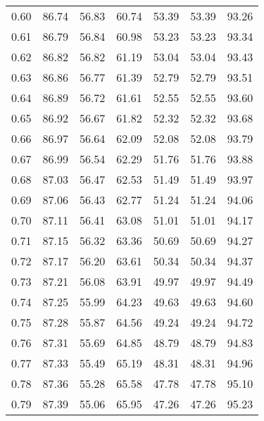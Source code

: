 \begin{tabular}{|c|c|c|c|c|c|c|}
      0.60 &     86.74 &     56.83 &      60.74 &   53.39 &      53.39 &         93.26 \\
      0.61 &     86.79 &     56.84 &      60.98 &   53.23 &      53.23 &         93.34 \\
      0.62 &     86.82 &     56.82 &      61.19 &   53.04 &      53.04 &         93.43 \\
      0.63 &     86.86 &     56.77 &      61.39 &   52.79 &      52.79 &         93.51 \\
      0.64 &     86.89 &     56.72 &      61.61 &   52.55 &      52.55 &         93.60 \\
      0.65 &     86.92 &     56.67 &      61.82 &   52.32 &      52.32 &         93.68 \\
      0.66 &     86.97 &     56.64 &      62.09 &   52.08 &      52.08 &         93.79 \\
      0.67 &     86.99 &     56.54 &      62.29 &   51.76 &      51.76 &         93.88 \\
      0.68 &     87.03 &     56.47 &      62.53 &   51.49 &      51.49 &         93.97 \\
      0.69 &     87.06 &     56.43 &      62.77 &   51.24 &      51.24 &         94.06 \\
      0.70 &     87.11 &     56.41 &      63.08 &   51.01 &      51.01 &         94.17 \\
      0.71 &     87.15 &     56.32 &      63.36 &   50.69 &      50.69 &         94.27 \\
      0.72 &     87.17 &     56.20 &      63.61 &   50.34 &      50.34 &         94.37 \\
      0.73 &     87.21 &     56.08 &      63.91 &   49.97 &      49.97 &         94.49 \\
      0.74 &     87.25 &     55.99 &      64.23 &   49.63 &      49.63 &         94.60 \\
      0.75 &     87.28 &     55.87 &      64.56 &   49.24 &      49.24 &         94.72 \\
      0.76 &     87.31 &     55.69 &      64.85 &   48.79 &      48.79 &         94.83 \\
      0.77 &     87.33 &     55.49 &      65.19 &   48.31 &      48.31 &         94.96 \\
      0.78 &     87.36 &     55.28 &      65.58 &   47.78 &      47.78 &         95.10 \\
      0.79 &     87.39 &     55.06 &      65.95 &   47.26 &      47.26 &         95.23 \\

\end{tabular}
